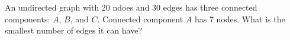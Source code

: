 \begin{prob}
    An undirected graph with 20 ndoes and 30 edges has three connected components:
    $A$, $B$, and $C$. Connected component $A$ has 7 nodes. What is the smallest
    number of edges it can have?


\end{prob}
